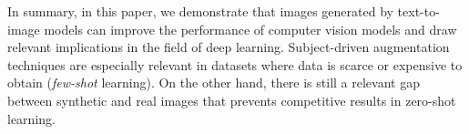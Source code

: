 In summary, in this paper, we demonstrate that images generated by text-to-image models can improve the performance of computer vision models and draw relevant implications in the field of deep learning. Subject-driven augmentation techniques are especially relevant in datasets where data is scarce or expensive to obtain (\textit{few-shot} learning). On the other hand, there is still a relevant gap between synthetic and real images that prevents competitive results in zero-shot learning.
